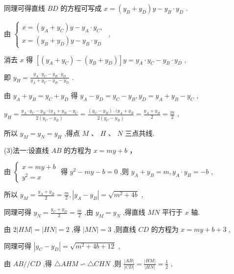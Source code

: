 \documentclass[10pt]{article}
\begin{document}
同理可得直线 \({BD}\) 的方程可写成 \(x = \left( {{y}_{B} + {y}_{D}}\right) y - {y}_{B} \cdot  {y}_{D}\) .

由 \(\left\{  \begin{array}{l} x = \left( {{y}_{A} + {y}_{C}}\right) y - {y}_{A} \cdot  {y}_{C}, \\  x = \left( {{y}_{B} + {y}_{D}}\right) y - {y}_{B} \cdot  {y}_{D} \end{array}\right.\) ,

消去 \(x\) 得 \(\left\lbrack  {\left( {{y}_{A} + {y}_{C}}\right)  - \left( {{y}_{B} + {y}_{D}}\right) }\right\rbrack  y = {y}_{A} \cdot  {y}_{C} - {y}_{B} \cdot  {y}_{D}\) ,

即 \({y}_{H} = \frac{{y}_{A} \cdot  {y}_{C} - {y}_{B} \cdot  {y}_{D}}{{y}_{A} + {y}_{C} - {y}_{B} - {y}_{D}}\) .

由 \({y}_{A} + {y}_{B} = {y}_{C} + {y}_{D}\) 得 \({y}_{A} - {y}_{D} = {y}_{C} - {y}_{B},{y}_{D} = {y}_{A} + {y}_{B} - {y}_{C}\) ,

\({y}_{H} = \frac{{y}_{A} \cdot  {y}_{C} - {y}_{B}\cdot ({y}_{A} + {y}_{B} - {y}_{C}}{2\left( {{y}_{C} - {y}_{B}}\right) } = \frac{\left( {{y}_{C} - {y}_{B}}\right) \cdot ({y}_{A} + {y}_{B}}{2\left( {{y}_{C} - {y}_{B}}\right) } = \frac{{y}_{A} + {y}_{B}}{2} = \frac{m}{2}\) ,

所以 \({y}_{M} = {y}_{N} = {y}_{H}\) ,得点 \(M\text{ 、 }H\text{ 、 }N\) 三点共线.

(3)法一:设直线 \({AB}\) 的方程为 \(x = {my} + b\) ，

由 \(\left\{  \begin{array}{l} x = {my} + b \\  {y}^{2} = x \end{array}\right.\) 得 \({y}^{2} - {my} - b = 0\) ,则 \({y}_{A} + {y}_{B} = m,{y}_{A} \cdot  {y}_{B} =  - b\) ,

所以 \({y}_{M} = \frac{{y}_{A} + {y}_{B}}{2} = \frac{m}{2},\left| {{y}_{A} - {y}_{B}}\right|  = \sqrt{{m}^{2} + {4b}}\) ,

同理可得 \({y}_{N} = \frac{{y}_{C} + {y}_{D}}{2} = \frac{m}{2}\) ,由 \({y}_{M} = {y}_{N}\) ,得直线 \({MN}\) 平行于 \(x\) 轴.

由 \(2\left| {HM}\right|  = \left| {HN}\right|  = 2\) ,得 \(\left| {MN}\right|  = 3\) ,则直线 \({CD}\) 的方程为 \(x = {my} + b + 3\) ,

同理可得 \(\left| {{y}_{C} - {y}_{D}}\right|  = \sqrt{{m}^{2} + {4b} + {12}}\) ,

由 \({AB}//{CD}\) ,得 \(\bigtriangleup {AHM} \backsim  \bigtriangleup {CHN}\) ,则 \(\frac{\left| AB\right| }{\left| CD\right| } = \frac{\left| HM\right| }{\left| HN\right| } = \frac{1}{2}\) ,
\end{document}
